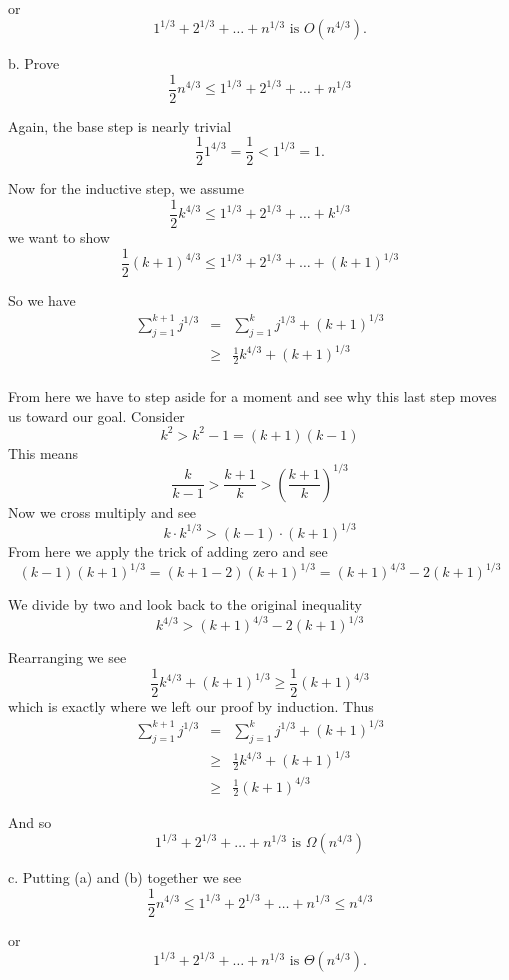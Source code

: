 \documentclass[16 pt]{amsart}
\theoremstyle{definition}
\theoremstyle{remark}
\numberwithin{equation}{subsection}
\begin{document}
or
\[
1^{1/3} + 2^{1/3} + \dots + n^{1/3} \text{ is } O(n^{4/3}).
\]

\vspace{1in}

b. Prove
\[
\frac{1}{2}n^{4/3} \leq 1^{1/3} + 2^{1/3} + \dots + n^{1/3} 
\]

Again, the base step is nearly trivial
\[
\frac{1}{2} 1^{4/3} = \frac{1}{2} < 1^{1/3} =1.
\]

Now for the inductive step, we assume
\[
\frac{1}{2}k^{4/3} \leq 1^{1/3} + 2^{1/3} + \dots + k^{1/3} 
\]
we want to show
\[
\frac{1}{2}(k+1)^{4/3} \leq 1^{1/3} + 2^{1/3} + \dots + (k+1)^{1/3} 
\]

So we have 
\begin{eqnarray*}
\sum_{j=1}^{k+1} j^{1/3} & = & \sum_{j=1}^{k} j^{1/3} + (k+1)^{1/3} \\
          & \geq & \frac{1}{2}k^{4/3} + (k+1)^{1/3}\\  
\end{eqnarray*}

From here we have to step aside for a moment and see why this last step moves us toward our goal.
Consider
\[
k^2 > k^2-1 = (k+1)(k-1)
\]
This means
\[
\frac{k}{k-1} > \frac{k+1}{k} > \left(\frac{k+1}{k}\right)^{1/3}
\]
Now we cross multiply and see
\[
k\cdot k^{1/3} > (k-1)\cdot (k+1)^{1/3}
\]
From here we apply the trick of adding zero and see
\[
(k-1)(k+1)^{1/3} = (k+1-2)(k+1)^{1/3} = (k+1)^{4/3} - 2(k+1)^{1/3}
\]

We divide by two and look back to the original inequality
\[
k^{4/3} > (k+1)^{4/3} - 2(k+1)^{1/3}
\]

Rearranging we see
\[
\frac{1}{2} k^{4/3} + (k+1)^{1/3} \geq \frac{1}{2}(k+1)^{4/3}
\]
which is exactly where we left our proof by induction.
Thus
\begin{eqnarray*}
\sum_{j=1}^{k+1} j^{1/3} & = & \sum_{j=1}^{k} j^{1/3} + (k+1)^{1/3} \\
          & \geq & \frac{1}{2}k^{4/3} + (k+1)^{1/3}\\  
          & \geq & \frac{1}{2}(k+1)^{4/3}     
\end{eqnarray*}

And so
\[
1^{1/3} + 2^{1/3} + \dots + n^{1/3} \text{ is } \Omega(n^{4/3})
\]

\vspace{1in}

c. Putting (a) and (b) together we see
\[
\frac{1}{2}n^{4/3} \leq 1^{1/3} + 2^{1/3} + \dots + n^{1/3} \leq n^{4/3}
\]

or 
\[
1^{1/3} + 2^{1/3} + \dots + n^{1/3} \text{ is } \Theta(n^{4/3}).
\]
\end{document}
